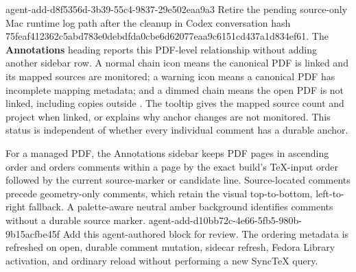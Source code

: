   {agent-add-d8f5356d-3b39-55c4-9837-29e502eaa9a3}
  {Retire the pending source-only Mac runtime log path after the cleanup in Codex conversation hash 75feaf412362c5abd783e0debdfda0cbe6d62077eaa9c6151cd437a1d834ef61.}
  {}
  {}
The \textbf{Annotations} heading reports this PDF-level relationship without adding another sidebar row.
A normal chain icon means the canonical PDF is linked and its mapped sources are monitored; a warning icon means a canonical PDF has incomplete mapping metadata; and a dimmed chain means the open PDF is not linked, including copies outside .
The tooltip gives the mapped source count and project when linked, or explains why anchor changes are not monitored.
This status is independent of whether every individual comment has a durable anchor.

For a managed PDF, the Annotations sidebar keeps PDF pages in ascending order and orders comments within a page by the exact build's TeX-input order followed by the current source-marker or candidate line.
Source-located comments precede geometry-only comments, which retain the visual top-to-bottom, left-to-right fallback.
A palette-aware neutral amber background identifies comments without a durable source marker.
\agentProposedEdit
  {agent-add-d10bb72c-4e66-5fb5-980b-9b15acfbe45f}
  {Add this agent-authored block for review.}
  {}
  {The ordering metadata is refreshed on open, durable comment mutation, sidecar refresh, Fedora Library activation, and ordinary reload without performing a new SyncTeX query.}


